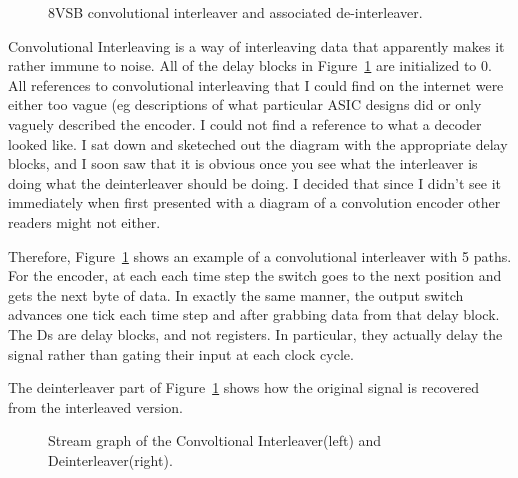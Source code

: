 \begin{figure}
\center
\epsfxsize=4.5in
\caption{8VSB convolutional interleaver and associated de-interleaver.}
\label{fig:convolution-interleaver}
\end{figure}

Convolutional Interleaving is a way of interleaving data that apparently makes
it rather immune to noise. All of the delay blocks in Figure~\ref{fig:convolution-interleaver}
are initialized to 0. All references to convolutional interleaving that I could find
on the internet were either too vague (eg descriptions of what particular ASIC designs did
or only vaguely described the encoder. I could not find a reference to what a decoder looked 
like. I sat down and sketeched out the diagram with the appropriate delay blocks, and I soon 
saw that it is obvious once you see what the interleaver is doing what the deinterleaver should
be doing. I decided that since I didn't see it immediately when first presented with a
diagram of a convolution encoder other readers might not either.

Therefore, Figure~\ref{fig:convolution-interleaver} shows an example of a convolutional
interleaver with 5 paths. For the encoder, at each each time step the switch goes to the
next position and gets the next byte of data. In exactly the same manner, the output
switch advances one tick each time step and after grabbing data from that delay block.
The Ds are delay blocks, and not registers. In particular, they actually delay the signal
rather than gating their input at each clock cycle.

The deinterleaver part of Figure~\ref{fig:convolution-interleaver} shows how the 
original signal is recovered from the interleaved version. 

\begin{figure}
\center
\epsfxsize=3.0in
\epsfxsize=3.0in
\caption{Stream graph of the Convoltional Interleaver(left) and Deinterleaver(right).}
\label{fig:sg-convolution-interleave}
\end{figure}


